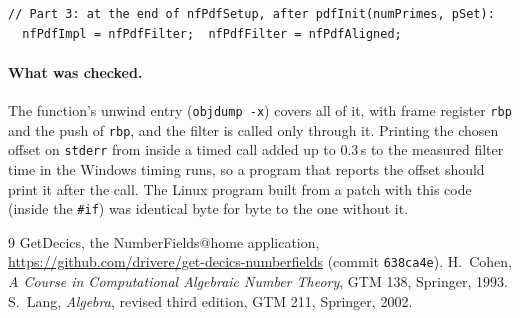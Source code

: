 \documentclass[10pt,a4paper]{article}
\newcommand{\code}[1]{\texttt{#1}}
\theoremstyle{plain}
\theoremstyle{definition}
\begin{document}
{\begin{verbatim}
// Part 3: at the end of nfPdfSetup, after pdfInit(numPrimes, pSet):
  nfPdfImpl = nfPdfFilter;  nfPdfFilter = nfPdfAligned;
\end{verbatim}}

\paragraph{What was checked.}  The function's unwind entry (\code{objdump -x}) covers all of it, with frame register \code{rbp} and the push of \code{rbp}, and
the filter is called only through it.  Printing the chosen offset on \code{stderr} from inside a timed call added up to $0.3$\,s to the measured filter time in
the Windows timing runs, so a program that reports the offset should print it after the call.  The Linux program built from a patch with this code (inside the
\code{\#if}) was identical byte for byte to the one without it.

{\small
\begin{thebibliography}{9}
 GetDecics, the NumberFields@home application, \url{https://github.com/drivere/get-decics-numberfields} (commit \code{638ca4e}).
 H.~Cohen, \emph{A Course in Computational Algebraic Number Theory}, GTM 138, Springer, 1993.
 S.~Lang, \emph{Algebra}, revised third edition, GTM 211, Springer, 2002.
\end{thebibliography}}
\end{document}
